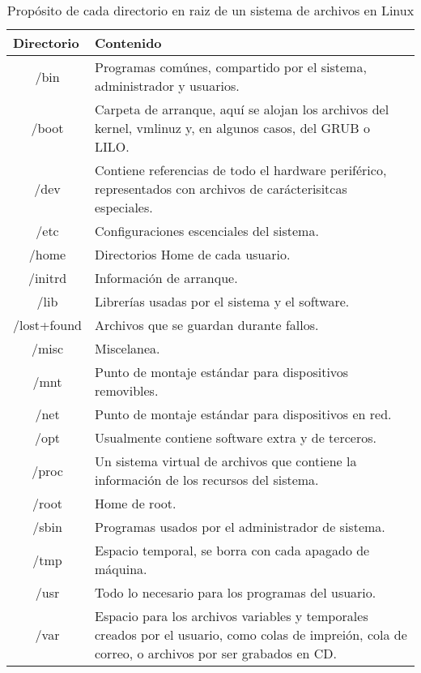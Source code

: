 \documentclass[11pt,letterpaper]{article} 	%
\begin{document}
\begin{table}[H]
\caption{Propósito de cada directorio en raiz de un sistema de archivos en Linux}
\begin{adjustbox}{width=1\textwidth}
\begin{tabular}{|c|l|}
\hline
\multicolumn{1}{|l|}{\textbf{Directorio}} & \textbf{Contenido} \\ \hline
/bin & Programas comúnes, compartido por el sistema, administrador y usuarios. \\ \hline
/boot & Carpeta de arranque, aquí se alojan los archivos del kernel, vmlinuz y, en algunos casos, del GRUB o LILO. \\ \hline
/dev & Contiene referencias de todo el hardware periférico, representados con archivos de carácterisitcas especiales. \\ \hline
/etc & Configuraciones escenciales del sistema. \\ \hline
/home & Directorios Home de cada usuario. \\ \hline
/initrd & Información de arranque. \\ \hline
/lib & Librerías usadas por el sistema y el software. \\ \hline
/lost+found & Archivos que se guardan durante fallos. \\ \hline
/misc & Miscelanea. \\ \hline
/mnt & Punto de montaje estándar para dispositivos removibles. \\ \hline
/net & Punto de montaje estándar para dispositivos en red. \\ \hline
/opt & Usualmente contiene software extra y de terceros. \\ \hline
/proc & Un sistema virtual de archivos que contiene la información de los recursos del sistema. \\ \hline
/root & Home de root. \\ \hline
/sbin & Programas usados por el administrador de sistema. \\ \hline
/tmp & Espacio temporal, se borra con cada apagado de máquina. \\ \hline
/usr & Todo lo necesario para los programas del usuario. \\ \hline
/var & Espacio para los archivos variables y temporales creados por el usuario, como colas de impreión, cola de correo, o archivos por ser grabados en CD. \\ \hline
\end{tabular}
\end{adjustbox}
\end{table}
\end{document}
